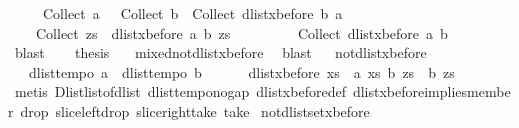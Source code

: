 \begin{isabellebody}
\ \ \ \ {\isacharparenleft}{\isacharparenleft}{\isacharminus}\ Collect\ a{\isacharparenright}\ {\isasymunion}\ {\isacharparenleft}{\isacharminus}\ Collect\ b{\isacharparenright}\ {\isasymunion}\ Collect\ {\isacharparenleft}dlist{\isacharunderscore}xbefore\ b\ a{\isacharparenright}{\isacharparenright}{\isachardoublequoteclose}\ \isanewline
\ \ \ \ {\isachardoublequoteopen}Collect\ {\isacharparenleft}{\isasymlambda}zs{\isachardot}\ {\isasymnot}\ {\isacharparenleft}dlist{\isacharunderscore}xbefore\ a\ b\ zs{\isacharparenright}{\isacharparenright}\ {\isacharequal}\ \isanewline
\ \ \ \ \ \ {\isacharminus}\ Collect\ {\isacharparenleft}dlist{\isacharunderscore}xbefore\ a\ b{\isacharparenright}{\isachardoublequoteclose}\isanewline
\ \ \ \ \isamarkupfalse%
\ blast{\isacharplus}\isanewline
\ \ \isamarkupfalse%
\ {\isacharquery}thesis\ \isamarkupfalse%
\ {}\ mixed{\isacharunderscore}not{\isacharunderscore}dlist{\isacharunderscore}xbefore\ \isamarkupfalse%
\ blast\isanewline
{}\isamarkupfalse%
%
\endisatagproof
{\isafoldproof}%
%
\isadelimproof
\ \isanewline
%
\endisadelimproof
\isanewline
{}\isamarkupfalse%
\ not{\isacharunderscore}{}{\isacharunderscore}dlist{\isacharunderscore}xbefore{\isacharcolon}\ \isanewline
\ \ {\isachardoublequoteopen}{\isasymlbrakk}\ dlist{\isacharunderscore}tempo{}\ a{\isacharsemicolon}\ \ dlist{\isacharunderscore}tempo{}\ b{\isasymrbrakk}\ {\isasymLongrightarrow}\ \isanewline
\ \ \ \ dlist{\isacharunderscore}xbefore\ {\isacharparenleft}{\isasymlambda}xs{\isachardot}\ {\isasymnot}\ a\ xs{\isacharparenright}\ b\ zs\ {\isacharequal}\ b\ zs{\isachardoublequoteclose}\isanewline
%
\isadelimproof
%
\endisadelimproof
%
\isatagproof
{}\isamarkupfalse%
\ {\isacharparenleft}metis\ Dlist{\isacharunderscore}list{\isacharunderscore}of{\isacharunderscore}dlist\ dlist{\isacharunderscore}tempo{\isacharunderscore}{}{\isacharunderscore}no{\isacharunderscore}gap\ dlist{\isacharunderscore}xbefore{\isacharunderscore}def\ dlist{\isacharunderscore}xbefore{\isacharunderscore}implies{\isacharunderscore}member{}\ drop{\isacharunderscore}{}\ slice{\isacharunderscore}left{\isacharunderscore}drop\ slice{\isacharunderscore}right{\isacharunderscore}take\ take{\isacharunderscore}{}{\isacharparenright}%
\endisatagproof
{\isafoldproof}%
%
\isadelimproof
\isanewline
%
\endisadelimproof
\isanewline
{}\isamarkupfalse%
\ not{\isacharunderscore}{}{\isacharunderscore}dlistset{\isacharunderscore}xbefore{\isacharcolon}\ \isanewline

\end{isabellebody}
